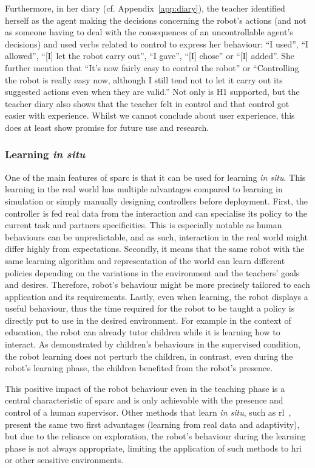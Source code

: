 Furthermore, in her diary (cf. Appendix~\ref{app:diary}), the teacher identified herself as the agent making the decisions concerning the robot's actions (and not as someone having to deal with the consequences of an uncontrollable agent's decisions) and used verbs related to control to express her behaviour: ``I used'', ``I allowed'', ``[I] let the robot carry out'', ``I gave'', ``[I] chose'' or ``[I] added''. She further mention that ``It’s now fairly easy to control the robot'' or ``Controlling the robot is really easy now, although I still tend not to let it carry out its suggested actions even when they are valid.'' 
Not only is H1 supported, but the teacher diary also shows that the teacher felt in control and that control got easier with experience. Whilst we cannot conclude about user experience, this does at least show promise for future use and research.

\subsubsection{Learning \emph{in situ}}

One of the main features of \gls{sparc} is that it can be used for learning \emph{in situ}. This learning in the real world has multiple advantages compared to learning in simulation or simply manually designing controllers before deployment. First, the controller is fed real data from the interaction and can specialise its policy to the current task and partners specificities. This is especially notable as human behaviours can be unpredictable, and as such, interaction in the real world might differ highly from expectations. Secondly, it means that the same robot with the same learning algorithm and representation of the world can learn different policies depending on the variations in the environment and the teachers' goals and desires. Therefore, robot's behaviour might be more precisely tailored to each application and its requirements. Lastly, even when learning, the robot displays a useful behaviour, thus the time required for the robot to be taught a policy is directly put to use in the desired environment. For example in the context of education, the robot can already tutor children while it is learning how to interact. As demonstrated by children's behaviours in the supervised condition, the robot learning does not perturb the children, in contrast, even during the robot's learning phase, the children benefited from the robot's presence. 

This positive impact of the robot behaviour even in the teaching phase is a central characteristic of \gls{sparc} and is only achievable with the presence and control of a human supervisor. Other methods that learn \emph{in situ}, such as \gls{rl}~\citep{sutton1998reinforcement}, present the same two first advantages (learning from real data and adaptivity), but due to the reliance on exploration, the robot's behaviour during the learning phase is not always appropriate, limiting the application of such methods to \gls{hri} or other sensitive environments.

